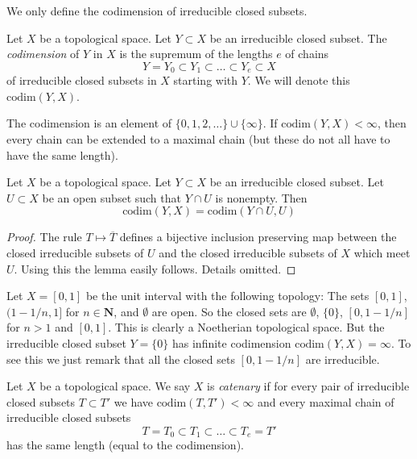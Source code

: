 \noindent
We only define the codimension of irreducible closed subsets.

\begin{definition}
\label{definition-codimension}
Let $X$ be a topological space.
Let $Y \subset X$ be an irreducible closed subset.
The {\it codimension} of $Y$ in $X$ is the supremum of
the lengths $e$ of chains
$$
Y = Y_0 \subset Y_1 \subset \ldots \subset Y_e \subset X
$$
of irreducible closed subsets in $X$ starting with $Y$.
We will denote this $\text{codim}(Y, X)$.
\end{definition}

\noindent
The codimension is an element of $\{0, 1, 2, \ldots\} \cup \{\infty\}$.
If $\text{codim}(Y, X) < \infty$, then every chain can be extended to
a maximal chain (but these do not all have to have the same length).

\begin{lemma}
\label{lemma-codimension-at-generic-point}
Let $X$ be a topological space.
Let $Y \subset X$ be an irreducible closed subset.
Let $U \subset X$ be an open subset such that $Y \cap U$ is nonempty.
Then
$$
\text{codim}(Y, X) = \text{codim}(Y \cap U, U)
$$
\end{lemma}

\begin{proof}
The rule $T \mapsto \overline{T}$ defines a bijective
inclusion preserving map between the closed irreducible subsets
of $U$ and the closed irreducible subsets of $X$ which meet $U$.
Using this the lemma easily follows. Details omitted.
\end{proof}

\begin{example}
\label{example-Noetherian-infinite-codimension}
Let $X = [0, 1]$ be the unit interval with the following
topology: The sets $[0, 1]$, $(1 - 1/n, 1]$ for $n \in \mathbf{N}$, and
$\emptyset$ are open. So the closed sets are
$\emptyset$, $\{0\}$, $[0, 1 - 1/n]$ for $n > 1$ and $[0, 1]$.
This is clearly a Noetherian topological space.
But the irreducible closed subset $Y = \{0\}$ has infinite
codimension $\text{codim}(Y, X) = \infty$.
To see this we just remark that all the closed sets
$[0, 1 - 1/n]$ are irreducible.
\end{example}

\begin{definition}
\label{definition-catenary}
Let $X$ be a topological space. We say $X$ is {\it catenary} if
for every pair of irreducible closed subsets $T \subset T'$
we have $\text{codim}(T, T') < \infty$ and every maximal chain
of irreducible closed subsets
$$
T = T_0 \subset T_1 \subset \ldots \subset T_e = T'
$$
has the same length (equal to the codimension).
\end{definition}

